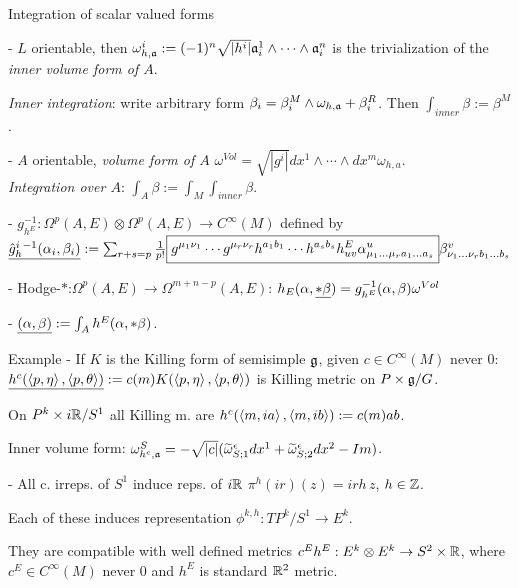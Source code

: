 \begin{frame}{Integration of scalar valued forms}
    
    - $L$ orientable, then $\omega_{h, \mathfrak{a}}^i := (-1)^n \sqrt{|h^i|} \mathfrak{a}_i^{1} \wedge \cdots \wedge \mathfrak{a}_i^{n} $ is the trivialization of the \emph{inner volume form of $A$}.
    
    \emph{Inner integration}: write arbitrary form $\beta_i = \beta^{M}_i \wedge \omega_{h, \mathfrak{a}} + \beta_i^R$. Then $\int_{inner} \beta := \beta^M$.
    
    - $A$ orientable, \emph{volume form of $A$} $\omega^{Vol}= \sqrt{|g^i|} dx^1 \wedge \cdots \wedge dx^m \omega_{h, a}$.
    \\\emph{Integration over $A$}: 
    $\int_A \beta := \int_M \int_{inner} \beta$.
    
    - $g^{-1}_{h^E}: \Omega^p(A, E) \otimes \Omega^p(A, E) \to C^\infty(M)$ defined by
    $\emph{\hat g^i_{h}{}^{-1} (\alpha_i, \beta_i)} 
    := \sum_{r+s = p} \frac{1}{p!}  \boxed{g^{\mu_1 \nu_1} \cdots g^{\mu_r \nu_r} h^{a_1 b_1} \cdots h^{a_s b_s} h^E_{uv} \alpha^u_{\mu_1 \dots \mu_r a_1 \dots a_s}} \beta^v_{\nu_1 \dots \nu_r b_1 \dots  b_s}$
    
    - Hodge-$*$:$\Omega^p(A, E) \to \Omega^{m+n-p}(A, E)$: $h_E(\alpha, \emph{*\beta}) = g^{-1}_{h^E}(\alpha, \beta) \omega^{Vol}$
    
     - $\emph{(\alpha, \beta)} := \int_A h^E(\alpha, *\beta)$.
\end{frame}



\begin{frame}{Example}
    - If $K$ is the Killing form of semisimple $\mathfrak{g}$, given $c \in C^\infty(M)$ never $0$: $\emph{h^c(\ensuremath{\left\langle p, \eta \right\rangle}, \ensuremath{\left\langle p, \theta \right\rangle})}:= c(m) K(\left\langle p, \eta \right\rangle, \left\langle p, \theta \right\rangle)$ is Killing metric on $P \times \mathfrak{g}/G$.
    
    On $P^k \times i\mathbb{R}/S^1$ all Killing m. are $h^c(\left\langle m, ia \right\rangle, \left\langle m, ib \right\rangle) := c(m)ab$.
    
    Inner volume form: $\omega^S_{h^c, \alg a} = -\sqrt{|c|} (\tilde \omega^\epsilon_{S; 1}dx^1 + \tilde \omega^\epsilon_{S; 2}dx^2 - Im)$.
    
    - All c. irreps. of $S^1$ induce reps. of $i\mathbb{R}$ $\pi^h(ir)(z) = irh\,z$, $h \in \mathbb{Z}$.
    
    Each of these induces representation $\phi^{k, h}: TP^k/S^1 \to E^k$.
    
    They are compatible with well defined metrics $c^E h^E : E^k \otimes E^k \to S^2 \times \mathbb{R}$, where $c^E \in C^\infty(M)$ never $0$ and $h^E$ is standard $\mathbb{R}^2$ metric.
\end{frame}